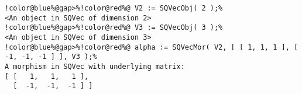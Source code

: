 \begin{Verbatim}[commandchars=!@\%,frame=single]
!color@blue%@gap>%!color@red%@ V2 := SQVecObj( 2 );%
<An object in SQVec of dimension 2>
!color@blue%@gap>%!color@red%@ V3 := SQVecObj( 3 );%
<An object in SQVec of dimension 3>
!color@blue%@gap>%!color@red%@ alpha := SQVecMor( V2, [ [ 1, 1, 1 ], [ -1, -1, -1 ] ], V3 );%
A morphism in SQVec with underlying matrix:
[ [   1,   1,   1 ],
  [  -1,  -1,  -1 ] ]

\end{Verbatim}
